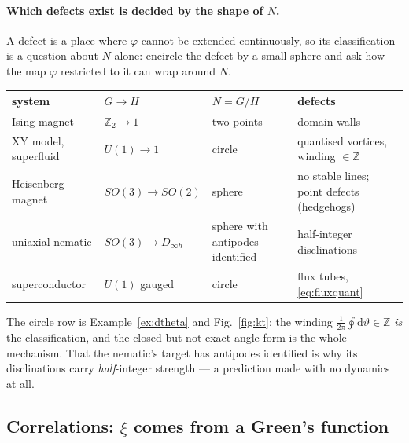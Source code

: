 \documentclass[10pt,a4paper]{article}
\newcommand{\dd}{\mathrm{d}}
\newcommand{\Z}{\mathbb{Z}}
\theoremstyle{plain}
\theoremstyle{definition}
\numberwithin{equation}{section}
\begin{document}
\paragraph{Which defects exist is decided by the shape of $N$.} A defect is a place where
$\varphi$ cannot be extended continuously, so its classification is a question about $N$ alone:
encircle the defect by a small sphere and ask how the map $\varphi$ restricted to it can wrap
around $N$.
\begin{center}\small
\renewcommand{\arraystretch}{1.18}
\begin{tabular}{@{}L{0.235\textwidth}L{0.165\textwidth}L{0.10\textwidth}L{0.39\textwidth}@{}}
\toprule
\textbf{system} & $G\to H$ & $N=G/H$ & \textbf{defects} \\
\midrule
Ising magnet         & $\Z_2\to1$              & two points & domain walls \\
XY model, superfluid & $U(1)\to1$              & circle     & quantised vortices, winding $\in\Z$ \\
Heisenberg magnet    & $SO(3)\to SO(2)$        & sphere     & no stable lines; point defects (hedgehogs) \\
uniaxial nematic     & $SO(3)\to D_{\infty h}$ & sphere with antipodes identified & half-integer disclinations \\
superconductor       & $U(1)$ gauged           & circle     & flux tubes, \eqref{eq:fluxquant} \\
\bottomrule
\end{tabular}
\end{center}
\noindent The circle row is Example~\ref{ex:dtheta} and Fig.~\ref{fig:kt}: the winding
$\frac1{2\pi}\oint\dd\vartheta\in\Z$ \emph{is} the classification, and the closed-but-not-exact
angle form is the whole mechanism. That the nematic's target has antipodes identified is why its
disclinations carry \emph{half}-integer strength --- a prediction made with no dynamics at all.

\subsection{Correlations: $\xi$ comes from a Green's function}
\end{document}
